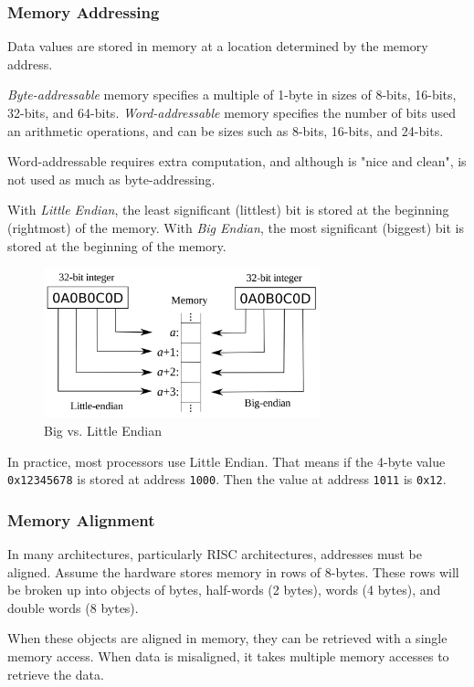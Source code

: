 \documentclass{article}
\begin{document}
\subsubsection{Memory Addressing}

Data values are stored in memory at a location determined by the memory address. 

\textit{Byte-addressable} memory specifies a multiple of 1-byte in sizes of 8-bits, 16-bits, 32-bits, and 64-bits. \textit{Word-addressable} memory specifies the number of bits used an arithmetic operations, and can be sizes such as 8-bits, 16-bits, and 24-bits. 

Word-addressable requires extra computation, and although is "nice and clean", is not used as much as byte-addressing. 

With \textit{Little Endian}, the least significant (littlest) bit is stored at the beginning (rightmost) of the memory. With \textit{Big Endian}, the most significant (biggest) bit is stored at the beginning of the memory.

\begin{figure}[ht!]
\centering
\includegraphics[width=80mm]{img/Endian.png}
\caption{Big vs. Little Endian}
\end{figure}

In practice, most processors use Little Endian. That means if the 4-byte value \texttt{0x12345678} is stored at address \texttt{1000}. Then the value at address \texttt{1011} is \texttt{0x12}.

\subsubsection{Memory Alignment}

In many architectures, particularly RISC architectures, addresses must be aligned. Assume the hardware stores memory in rows of 8-bytes. These rows will be broken up into objects of bytes, half-words (2 bytes), words (4 bytes), and double words (8 bytes). 

When these objects are aligned in memory, they can be retrieved with a single memory access. When data is misaligned, it takes multiple memory accesses to retrieve the data.
\end{document}
